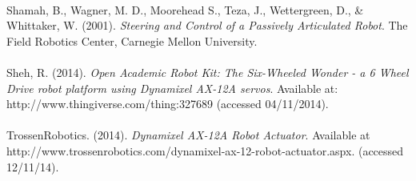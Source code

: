 \documentclass[]{article}
\begin{document}
\\
Shamah, B.,  Wagner, M. D., Moorehead S., Teza, J., Wettergreen, D., \& Whittaker, W. (2001). \textit{Steering and Control of a Passively Articulated Robot}. The Field Robotics Center, Carnegie Mellon University.\\
\\
Sheh, R. (2014). \textit{Open Academic Robot Kit: The Six-Wheeled Wonder - a 6 Wheel Drive robot platform using Dynamixel AX-12A servos}. Available at: http://www.thingiverse.com/thing:327689 (accessed 04/11/2014).\\
\\
TrossenRobotics. (2014). \textit{Dynamixel AX-12A Robot Actuator}. Available at http://www.trossenrobotics.com/dynamixel-ax-12-robot-actuator.aspx. (accessed 12/11/14).
\end{document}
